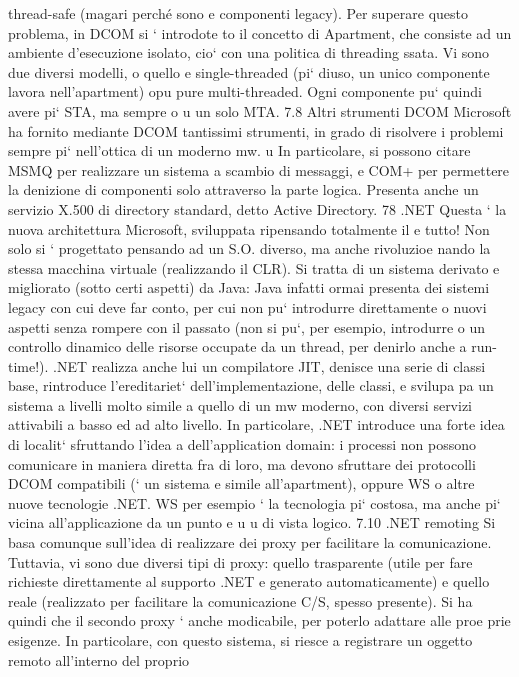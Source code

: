 \documentclass[a4paper,12pt]{article}
\begin{document}
thread-safe (magari perché sono
e
componenti legacy). Per superare questo problema, in DCOM si ` introdote
to il concetto di Apartment, che consiste ad un ambiente d'esecuzione isolato,
cio` con una politica di threading ssata. Vi sono due diversi modelli, o quello
e
single-threaded (pi` diuso, un unico componente lavora nell'apartment) opu
pure multi-threaded. Ogni componente pu` quindi avere pi` STA, ma sempre
o
u
un solo MTA.
7.8
Altri strumenti DCOM
Microsoft ha fornito mediante DCOM tantissimi strumenti, in grado di risolvere
i problemi sempre pi` nell'ottica di un moderno mw.
u
In particolare, si possono citare MSMQ per realizzare un sistema a scambio di
messaggi, e COM+ per permettere la denizione di componenti solo attraverso
la parte logica. Presenta anche un servizio X.500 di directory standard, detto
Active Directory.
78
.NET
Questa ` la nuova architettura Microsoft, sviluppata ripensando totalmente il
e
tutto! Non solo si ` progettato pensando ad un S.O. diverso, ma anche rivoluzioe
nando la stessa macchina virtuale (realizzando il CLR). Si tratta di un sistema
derivato e migliorato (sotto certi aspetti) da Java: Java infatti ormai presenta
dei sistemi legacy con cui deve far conto, per cui non pu` introdurre direttamente
o
nuovi aspetti senza rompere con il passato (non si pu`, per esempio, introdurre
o
un controllo dinamico delle risorse occupate da un thread, per denirlo anche a
run-time!). .NET realizza anche lui un compilatore JIT, denisce una serie di
classi base, rintroduce l'ereditariet` dell'implementazione, delle classi, e svilupa
pa un sistema a livelli molto simile a quello di un mw moderno, con diversi
servizi attivabili a basso ed ad alto livello.
In particolare, .NET introduce una forte idea di localit` sfruttando l'idea
a
dell'application domain: i processi non possono comunicare in maniera diretta
fra di loro, ma devono sfruttare dei protocolli DCOM compatibili (` un sistema
e
simile all'apartment), oppure WS o altre nuove tecnologie .NET. WS per esempio ` la tecnologia pi` costosa, ma anche pi`
vicina all'applicazione da un punto
e
u
u
di vista logico.
7.10
.NET remoting
Si basa comunque sull'idea di realizzare dei proxy per facilitare la comunicazione.
Tuttavia, vi sono due diversi tipi di proxy: quello trasparente (utile per fare
richieste direttamente al supporto .NET e generato automaticamente) e quello
reale (realizzato per facilitare la comunicazione C/S, spesso presente). Si ha
quindi che il secondo proxy ` anche modicabile, per poterlo adattare alle proe
prie esigenze. In particolare, con questo sistema, si riesce a registrare un oggetto remoto all'interno del proprio
\end{document}
